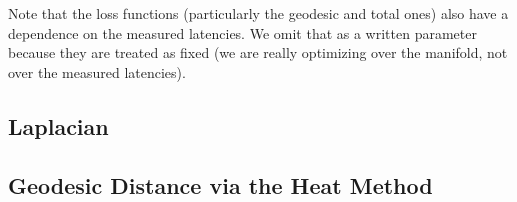 \documentclass[10pt]{article}
\begin{document}
	Note that the loss functions (particularly the geodesic and total ones) also have a dependence on the measured latencies. We omit that as a written parameter because they are treated as fixed (we are really optimizing over the manifold, not over the measured latencies).

	\subsection{Laplacian}
	

	\subsection{Geodesic Distance via the Heat Method}
	
\end{document}
